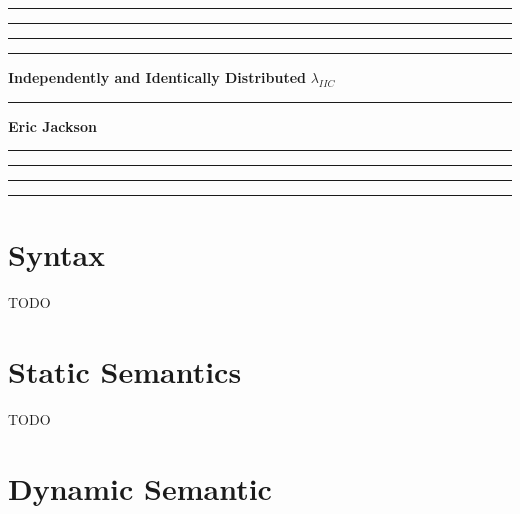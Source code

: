 \documentclass{article}
\begin{document}
	\hrule
	\smallskip
	\hrule\hrule\hrule
	\medskip
	\noindent
	{\huge \bf Independently and Identically Distributed}
	\medskip
	\newline
	{\huge \it $\lambda_{IIC}$}
	\smallskip
	\hrule
	\medskip
	\noindent
	{\Large \bf Eric Jackson}
	\medskip
	\hrule\hrule\hrule
	\smallskip
	\hrule

\section{Syntax}

TODO

\section{Static Semantics}

TODO

\section{Dynamic Semantic}

\end{document}

